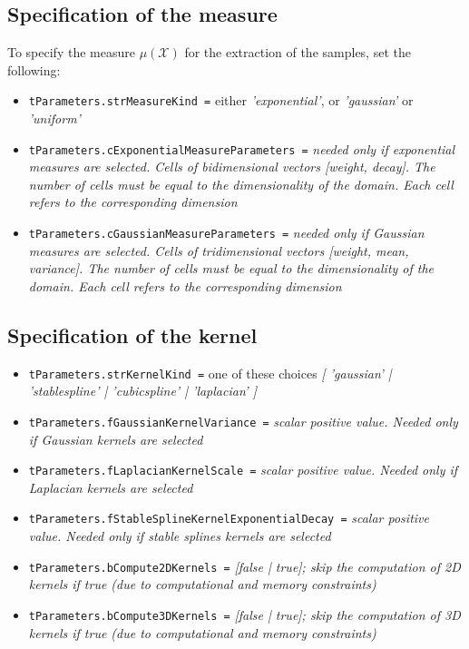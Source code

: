 \documentclass[a4paper, 10pt, twoside]{article} %
\begin{document}
\subsection{Specification of the measure}
\label{ssec:measure}

To specify the measure $\mu \left( \mathcal{X} \right)$ for the extraction of the samples, set the following:
%
\begin{itemize}
	\item \texttt{tParameters.strMeasureKind =} either \emph{'exponential'}, or \emph{'gaussian'} or \emph{'uniform'}
	\item \texttt{tParameters.cExponentialMeasureParameters =} \emph{needed only if exponential measures are selected. Cells of bidimensional vectors [weight, decay]. The number of cells must be equal to the dimensionality of the domain. Each cell refers to the corresponding dimension}
	\item \texttt{tParameters.cGaussianMeasureParameters =} \emph{needed only if Gaussian measures are selected. Cells of tridimensional vectors [weight, mean, variance]. The number of cells must be equal to the dimensionality of the domain. Each cell refers to the corresponding dimension}
\end{itemize}



\subsection{Specification of the kernel}
\label{ssec:kernel}

\begin{itemize}
	\item \texttt{tParameters.strKernelKind =} one of these choices \emph{[ 'gaussian' | 'stablespline' | 'cubicspline' | 'laplacian' ]}
	\item \texttt{tParameters.fGaussianKernelVariance =} \emph{scalar positive value. Needed only if Gaussian kernels are selected}
	\item \texttt{tParameters.fLaplacianKernelScale =} \emph{scalar positive value. Needed only if Laplacian kernels are selected}
	\item \texttt{tParameters.fStableSplineKernelExponentialDecay =} \emph{scalar positive value. Needed only if stable splines kernels are selected}
	\item \texttt{tParameters.bCompute2DKernels =} \emph{[false | true]; skip the computation of 2D kernels if true (due to computational and memory constraints)}
	\item \texttt{tParameters.bCompute3DKernels =} \emph{[false | true]; skip the computation of 3D kernels if true (due to computational and memory constraints)}
\end{itemize}
\end{document}

